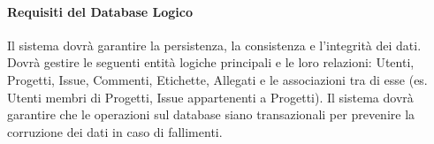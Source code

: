 \paragraph{Requisiti del Database Logico}
\label{subsubsec:database-logico}
Il sistema dovrà garantire la persistenza, la consistenza e l'integrità dei dati. 
Dovrà gestire le seguenti entità logiche principali e le loro relazioni: 
Utenti, Progetti, Issue, Commenti, Etichette, Allegati e le associazioni tra di esse 
(es. Utenti membri di Progetti, Issue appartenenti a Progetti). 
Il sistema dovrà garantire che le operazioni sul database siano transazionali per prevenire la corruzione dei dati in caso di fallimenti.
\newpage